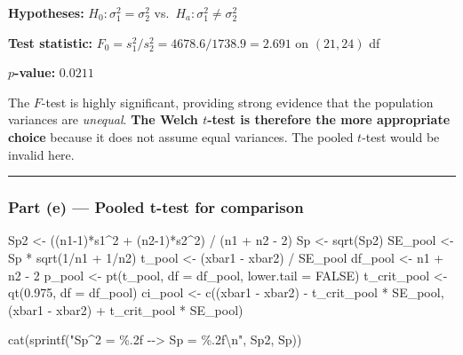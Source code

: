 \documentclass[
  letterpaper,
  DIV=11,
  numbers=noendperiod]{scrartcl}
\newenvironment{Shaded}{\begin{snugshade}}{\end{snugshade}}
\newcommand{\AttributeTok}[1]{\textcolor[rgb]{0.40,0.45,0.13}{#1}}
\newcommand{\ConstantTok}[1]{\textcolor[rgb]{0.56,0.35,0.01}{#1}}
\newcommand{\DecValTok}[1]{\textcolor[rgb]{0.68,0.00,0.00}{#1}}
\newcommand{\FloatTok}[1]{\textcolor[rgb]{0.68,0.00,0.00}{#1}}
\newcommand{\FunctionTok}[1]{\textcolor[rgb]{0.28,0.35,0.67}{#1}}
\newcommand{\NormalTok}[1]{\textcolor[rgb]{0.00,0.23,0.31}{#1}}
\newcommand{\OtherTok}[1]{\textcolor[rgb]{0.00,0.23,0.31}{#1}}
\newcommand{\SpecialCharTok}[1]{\textcolor[rgb]{0.37,0.37,0.37}{#1}}
\newcommand{\StringTok}[1]{\textcolor[rgb]{0.13,0.47,0.30}{#1}}
\begin{document}
\textbf{Hypotheses:} \(H_0: \sigma_1^2 = \sigma_2^2\)
vs.~\(H_a: \sigma_1^2 \neq \sigma_2^2\)

\textbf{Test statistic:}
\(F_0 = s_1^2 / s_2^2 = 4678.6 / 1738.9 = 2.691\) on \((21, 24)\) df

\textbf{\(p\)-value:} \(0.0211\)

The \(F\)-test is highly significant, providing strong evidence that the
population variances are \emph{unequal}. \textbf{The Welch \(t\)-test is
therefore the more appropriate choice} because it does not assume equal
variances. The pooled \(t\)-test would be invalid here.

\begin{center}\rule{0.5\linewidth}{0.5pt}\end{center}

\subsubsection{Part (e) --- Pooled t-test for
comparison}\label{part-e-pooled-t-test-for-comparison}

\begin{Shaded}
\begin{Highlighting}[]
\NormalTok{Sp2 }\OtherTok{\textless{}{-}}\NormalTok{ ((n1}\DecValTok{{-}1}\NormalTok{)}\SpecialCharTok{*}\NormalTok{s1}\SpecialCharTok{\^{}}\DecValTok{2} \SpecialCharTok{+}\NormalTok{ (n2}\DecValTok{{-}1}\NormalTok{)}\SpecialCharTok{*}\NormalTok{s2}\SpecialCharTok{\^{}}\DecValTok{2}\NormalTok{) }\SpecialCharTok{/}\NormalTok{ (n1 }\SpecialCharTok{+}\NormalTok{ n2 }\SpecialCharTok{{-}} \DecValTok{2}\NormalTok{)}
\NormalTok{Sp  }\OtherTok{\textless{}{-}} \FunctionTok{sqrt}\NormalTok{(Sp2)}
\NormalTok{SE\_pool }\OtherTok{\textless{}{-}}\NormalTok{ Sp }\SpecialCharTok{*} \FunctionTok{sqrt}\NormalTok{(}\DecValTok{1}\SpecialCharTok{/}\NormalTok{n1 }\SpecialCharTok{+} \DecValTok{1}\SpecialCharTok{/}\NormalTok{n2)}
\NormalTok{t\_pool  }\OtherTok{\textless{}{-}}\NormalTok{ (xbar1 }\SpecialCharTok{{-}}\NormalTok{ xbar2) }\SpecialCharTok{/}\NormalTok{ SE\_pool}
\NormalTok{df\_pool }\OtherTok{\textless{}{-}}\NormalTok{ n1 }\SpecialCharTok{+}\NormalTok{ n2 }\SpecialCharTok{{-}} \DecValTok{2}
\NormalTok{p\_pool  }\OtherTok{\textless{}{-}} \FunctionTok{pt}\NormalTok{(t\_pool, }\AttributeTok{df =}\NormalTok{ df\_pool, }\AttributeTok{lower.tail =} \ConstantTok{FALSE}\NormalTok{)}
\NormalTok{t\_crit\_pool }\OtherTok{\textless{}{-}} \FunctionTok{qt}\NormalTok{(}\FloatTok{0.975}\NormalTok{, }\AttributeTok{df =}\NormalTok{ df\_pool)}
\NormalTok{ci\_pool }\OtherTok{\textless{}{-}} \FunctionTok{c}\NormalTok{((xbar1 }\SpecialCharTok{{-}}\NormalTok{ xbar2) }\SpecialCharTok{{-}}\NormalTok{ t\_crit\_pool }\SpecialCharTok{*}\NormalTok{ SE\_pool,}
\NormalTok{             (xbar1 }\SpecialCharTok{{-}}\NormalTok{ xbar2) }\SpecialCharTok{+}\NormalTok{ t\_crit\_pool }\SpecialCharTok{*}\NormalTok{ SE\_pool)}

\FunctionTok{cat}\NormalTok{(}\FunctionTok{sprintf}\NormalTok{(}\StringTok{"Sp\^{}2 = \%.2f  {-}{-}\textgreater{}  Sp = \%.2f}\SpecialCharTok{\textbackslash{}n}\StringTok{"}\NormalTok{, Sp2, Sp))}
\end{Highlighting}
\end{Shaded}
\end{document}
